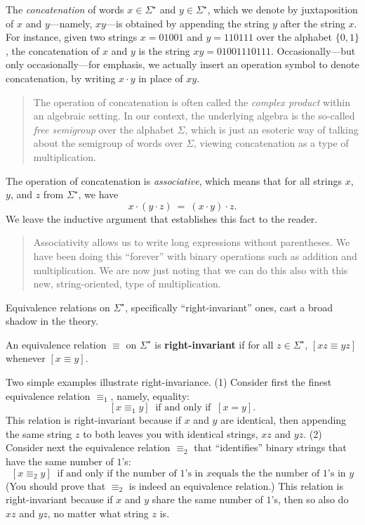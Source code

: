 \documentclass{article}
\begin{document}
{The {\em concatenation}
of words $x \in \Sigma^\star$ and $y \in \Sigma^\star$, which we
denote by juxtaposition of $x$ and $y$---namely, $xy$---is obtained by
appending the string $y$ after the string $x$.  For instance, given
two strings $x = 01001$ and $y = 110111$ over the alphabet $\{ 0,1\}$,
the concatenation of $x$ and $y$ is the string $xy = 01001110111$.
Occasionally---but only occasionally---for emphasis, we actually
insert an operation symbol to denote concatenation, by writing $x
\cdot y$ in place of $xy$.
\begin{quote}
The operation of concatenation is often called the {\em complex
  product} within an algebraic setting.  In our context, the
underlying algebra is the so-called {\em free semigroup}
over the alphabet $\Sigma$, which is just an esoteric way of talking
about the semigroup of words over $\Sigma$, viewing concatenation as a
type of multiplication.
\end{quote}
The operation of concatenation is 
{\em associative},
which means that for all strings $x$, $y$, and $z$ from
$\Sigma^\star$, we have
\[ x \cdot (y \cdot z) \ = \ (x \cdot y) \cdot z. \]
We leave the inductive argument that establishes this fact to the reader.
\begin{quote}
Associativity allows us to write long expressions without
parentheses.  We have been doing this ``forever'' with binary
operations such as addition and multiplication.  We are now just
noting that we can do this also with this new, string-oriented, type
of multiplication.
\end{quote}

Equivalence relations on $\Sigma^\star$, specifically
``right-invariant'' ones, cast a broad shadow in the theory.

An equivalence relation $\equiv$ on $\Sigma^\star$ is {\bf
  right-invariant}
if for all $z \in \Sigma^\star$, $[xz \equiv yz]$ whenever $[x \equiv
  y]$.

Two simple examples illustrate right-invariance.  (1) Consider first
the finest equivalence relation $\equiv_1$, namely, equality:
\[ [x \equiv_1 y] \ \mbox{ if and only if } \ [x=y].  \]
This relation is right-invariant because if $x$ and $y$ are identical,
then appending the same string $z$ to both leaves you with identical
strings, $xz$ and $yz$.  (2) Consider next the equivalence relation
$\equiv_2$ that ``identifies'' binary strings that have the same
number of $1$'s:
\[ [x \equiv_2 y] \ \mbox{ if and only if the number of $1$'s in $x$
  equals the the number of $1$'s in $y$} 
\]
(You should prove that $\equiv_2$ is indeed an equivalence relation.)
This relation is right-invariant because if $x$ and $y$ share the same
number of $1$'s, then so also do $xz$ and $yz$, no matter what string
$z$ is.

}
\end{document}

